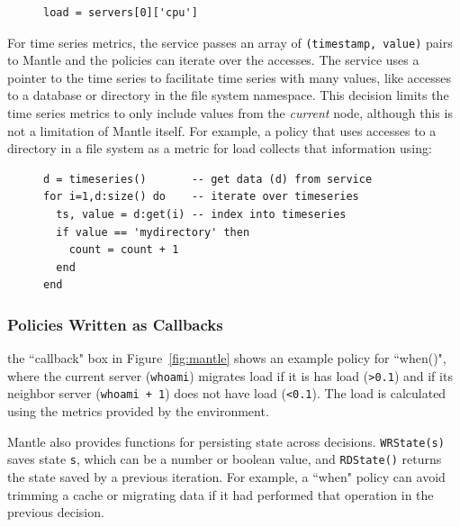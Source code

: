 \begin{figure}[h]
\footnotesize
\begin{verbatim}
load = servers[0]['cpu']
\end{verbatim}
\end{figure}

For time series metrics, the service passes an array of \texttt{(timestamp,
value)} pairs to Mantle and the policies can iterate over the accesses.  The
service uses a pointer to the time series to facilitate time series with many
values, like accesses to a database or directory in the file system namespace.
This decision limits the time series metrics to only include values from the
{\it current } node, although this is not a limitation of Mantle itself.  For
example, a policy that uses accesses to a directory in a file system as a
metric for load collects that information using:

\begin{figure}[h]
\footnotesize
\begin{verbatim}
d = timeseries()       -- get data (d) from service
for i=1,d:size() do    -- iterate over timeseries
  ts, value = d:get(i) -- index into timeseries 
  if value == 'mydirectory' then
    count = count + 1
  end
end
\end{verbatim}
\end{figure}



\subsubsection{Policies Written as Callbacks} the ``callback" box in
Figure~\ref{fig:mantle} shows an example policy for ``when()", where the
current server (\texttt{whoami}) migrates load if it is has load
(\texttt{>0.1}) and if its neighbor server (\texttt{whoami + 1}) does not have
load (\texttt{<0.1}). The load is calculated using the metrics provided by the
environment.

Mantle also provides functions for persisting state across decisions.
\texttt{WRState(s)} saves state \texttt{s}, which can be a number or boolean
value, and \texttt{RDState()} returns the state saved by a previous iteration.
For example, a ``when" policy can avoid trimming a cache or migrating data if
it had performed that operation in the previous decision.


